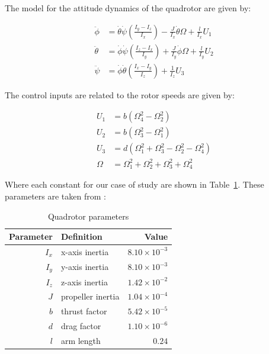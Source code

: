 \documentclass[12pt]{article}
\begin{document}
The model for the attitude dynamics of the quadrotor are given by:

\begin{equation}
  \label{eq:dynamics}
  \begin{split}
    \ddot{\phi} &= \dot{\theta} \dot{\psi} \left ( \frac{I_y-I_z}{I_x} \right ) - \frac{J}{I_x} \dot{\theta} \Omega + \frac{l}{I_x} U_1 \\
    \ddot{\theta} &= \dot{\phi} \dot{\psi} \left ( \frac{I_z-I_x}{I_y} \right ) + \frac{J}{I_y} \dot{\phi} \Omega + \frac{l}{I_y} U_2 \\
    \ddot{\psi} &= \dot{\phi} \dot{\theta} \left ( \frac{I_x-I_y}{I_z} \right ) + \frac{1}{I_z} U_3
  \end{split}
\end{equation}

The control inputs are related to the rotor speeds are given by:

\begin{equation}
  \label{eq:inputs}
  \begin{split}
  U_1 &= b \left (\Omega^2_4 - \Omega^2_2 \right ) \\
  U_2 &= b \left (\Omega^2_3 - \Omega^2_1 \right ) \\
  U_3 &= d \left (\Omega^2_1 + \Omega^2_3 - \Omega^2_2 - \Omega^2_4 \right ) \\
  \Omega &= \Omega^2_1 + \Omega^2_2 + \Omega^2_3 + \Omega^2_4
  \end{split}
\end{equation}

Where each constant for our case of study are shown in Table~\ref{tab:parameters}. These parameters are taken from \cite{Merh14}:

\begin{table}
  \begin{center}
    \caption{Quadrotor parameters}\label{tab:parameters}
    \begin{tabular}{rlr}
      \hline
      Parameter & Definition & Value \\
      \hline                  
      $I_x$ & x-axis inertia & $8.10 \times {10}^{-3}$\\
      $I_y$ & y-axis inertia & $8.10 \times {10}^{-3}$\\
      $I_z$ & z-axis inertia & $1.42 \times {10}^{-2}$ \\
      $J$ & propeller inertia & $1.04 \times {10}^{-4}$ \\
      $b$ & thrust factor & $ 5.42 \times {10}^{-5}$ \\
      $d$ & drag factor & $ 1.10 \times{10}^{-6}$ \\
      $l$ & arm length & $0.24$ \\
      \hline
    \end{tabular}
  \end{center}
\end{table}
\end{document}
